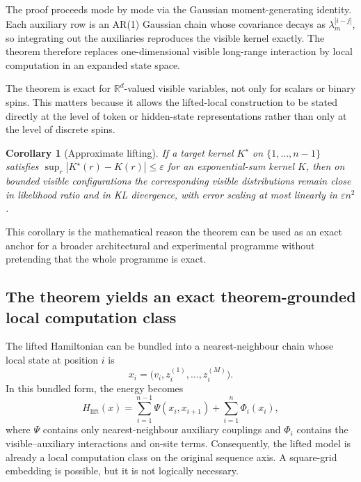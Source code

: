 \documentclass[11pt]{article}
\newtheorem{corollary}{Corollary}
\theoremstyle{definition}
\newcommand{\R}{\mathbb{R}}
\begin{document}
The proof proceeds mode by mode via the Gaussian moment-generating identity. Each auxiliary row is an AR(1) Gaussian chain whose covariance decays as \(\lambda_m^{|i-j|}\), so integrating out the auxiliaries reproduces the visible kernel exactly. The theorem therefore replaces one-dimensional visible long-range interaction by local computation in an expanded state space.

The theorem is exact for \(\R^d\)-valued visible variables, not only for scalars or binary spins. This matters because it allows the lifted-local construction to be stated directly at the level of token or hidden-state representations rather than only at the level of discrete spins.

\begin{corollary}[Approximate lifting]
\label{cor:approx-lifting}
If a target kernel \(K^\star\) on \(\{1,\dots,n-1\}\) satisfies \(\sup_r|K^\star(r)-K(r)|\le \varepsilon\) for an exponential-sum kernel \(K\), then on bounded visible configurations the corresponding visible distributions remain close in likelihood ratio and in KL divergence, with error scaling at most linearly in \(\varepsilon n^2\).
\end{corollary}

This corollary is the mathematical reason the theorem can be used as an exact anchor for a broader architectural and experimental programme without pretending that the whole programme is exact.

\subsection*{The theorem yields an exact theorem-grounded local computation class}

The lifted Hamiltonian can be bundled into a nearest-neighbour chain whose local state at position \(i\) is
\[
x_i=\bigl(v_i, z_i^{(1)},\dots,z_i^{(M)}\bigr).
\]
In this bundled form, the energy becomes
\begin{equation}
H_{\mathrm{lift}}(x)
=
\sum_{i=1}^{n-1}\Psi(x_i,x_{i+1})
+
\sum_{i=1}^{n}\Phi_i(x_i),
\label{eq:bundled-chain}
\end{equation}
where \(\Psi\) contains only nearest-neighbour auxiliary couplings and \(\Phi_i\) contains the visible--auxiliary interactions and on-site terms. Consequently, the lifted model is already a local computation class on the original sequence axis. A square-grid embedding is possible, but it is not logically necessary.
\end{document}
